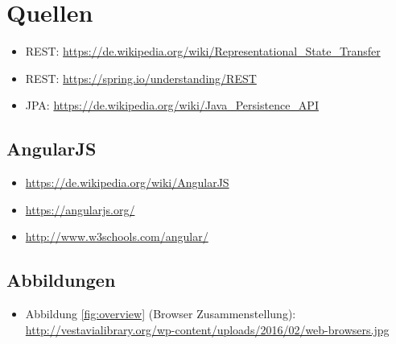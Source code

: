 \section{Quellen}

\begin{itemize}
	\item REST: \url{https://de.wikipedia.org/wiki/Representational_State_Transfer} 
	\item REST: \url{https://spring.io/understanding/REST} 
	\item JPA: \url{https://de.wikipedia.org/wiki/Java_Persistence_API} 
\end{itemize}

\subsection{AngularJS}

\begin{itemize}
	\item \url{https://de.wikipedia.org/wiki/AngularJS} 
	\item \url{https://angularjs.org/}
	\item \url{http://www.w3schools.com/angular/}
\end{itemize}

\subsection{Abbildungen}

\begin{itemize}
	\item Abbildung \ref{fig:overview} (Browser Zusammenstellung): \url{http://vestavialibrary.org/wp-content/uploads/2016/02/web-browsers.jpg}

\end{itemize}